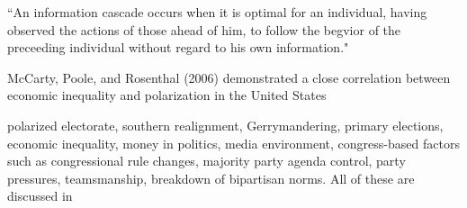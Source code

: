 \cite{bikhchandani1992theory}
``An information cascade occurs when it is optimal for an individual, having observed the actions of those ahead of him, to follow the begvior of the preceeding individual without regard to his own information."



McCarty, Poole, and Rosenthal (2006) demonstrated a close correlation between economic
inequality and polarization in the United States


polarized electorate, southern realignment, Gerrymandering, primary elections, economic inequality, money in politics, media environment, congress-based factors such as congressional rule changes, majority party agenda control, party pressures, teamsmanship, breakdown of bipartisan norms.  All of these are discussed in  \cite{poole1984polarization}